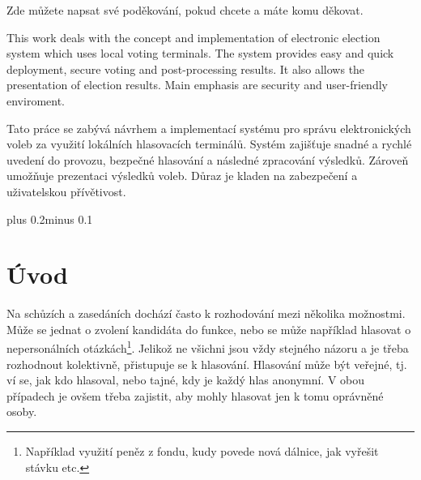 \documentclass[11pt,twoside,a4paper]{book}
\begin{document}

\coverpagestarts


\acknowledgements
\noindent
Zde můžete napsat své poděkování, pokud chcete a máte komu děkovat.





 
\abstractpage

This work deals with the concept and implementation of electronic election system which uses local voting terminals. The system provides easy and quick deployment, secure voting and post-processing results. It also allows the presentation of election results. Main emphasis are security and user-friendly enviroment.


\baselineskip

Tato práce se zabývá návrhem a implementací systému pro správu elektronických voleb za využití lokálních hlasovacích terminálů. Systém zajišťuje snadné a rychlé uvedení do provozu, bezpečné hlasování a následné zpracování výsledků. Zároveň umožňuje prezentaci výsledků voleb. Důraz je kladen na zabezpečení a uživatelskou přívětivost.


\tableofcontents



\listoffigures



\listoftables



\mainbodystarts
\normalfont
{}\baselineskip plus 0.2\baselineskip minus 0.1\baselineskip



\chapter{Úvod}

Na schůzích a zasedáních dochází často k rozhodování mezi několika možnostmi. Může se jednat o zvolení kandidáta do funkce, nebo se může například hlasovat o nepersonálních otázkách\footnote{Například využití peněz z fondu, kudy povede nová dálnice, jak vyřešit stávku etc.}. Jelikož ne všichni jsou vždy stejného názoru a je třeba rozhodnout kolektivně, přistupuje se k hlasování. Hlasování může být veřejné, tj. ví se, jak kdo hlasoval, nebo tajné, kdy je každý hlas anonymní. V obou případech je ovšem třeba zajistit, aby mohly hlasovat jen k tomu oprávněné osoby.
\end{document}
